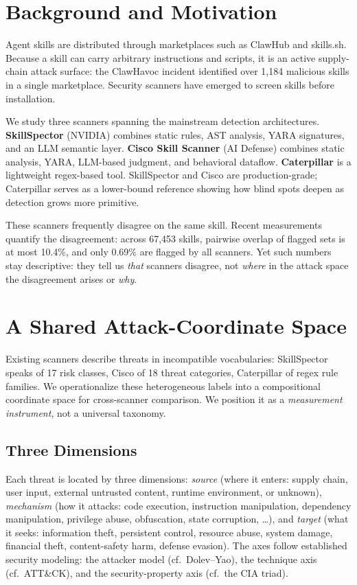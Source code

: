 \documentclass[sigconf,nonacm]{acmart}
\begin{document}
\section{Background and Motivation}
\label{sec:background}

Agent skills are distributed through marketplaces such as ClawHub and skills.sh. Because a skill can carry arbitrary instructions and scripts, it is an active supply-chain attack surface: the ClawHavoc incident identified over 1{,}184 malicious skills in a single marketplace. Security scanners have emerged to screen skills before installation.

We study three scanners spanning the mainstream detection architectures. \textbf{SkillSpector} (NVIDIA) combines static rules, AST analysis, YARA signatures, and an LLM semantic layer. \textbf{Cisco Skill Scanner} (AI Defense) combines static analysis, YARA, LLM-based judgment, and behavioral dataflow. \textbf{Caterpillar} is a lightweight regex-based tool. SkillSpector and Cisco are production-grade; Caterpillar serves as a lower-bound reference showing how blind spots deepen as detection grows more primitive.

These scanners frequently disagree on the same skill. Recent measurements quantify the disagreement: across 67{,}453 skills, pairwise overlap of flagged sets is at most 10.4\%, and only 0.69\% are flagged by all scanners. Yet such numbers stay descriptive: they tell us \emph{that} scanners disagree, not \emph{where} in the attack space the disagreement arises or \emph{why}.

\section{A Shared Attack-Coordinate Space}
\label{sec:measure}

Existing scanners describe threats in incompatible vocabularies: SkillSpector speaks of 17 risk classes, Cisco of 18 threat categories, Caterpillar of regex rule families. We operationalize these heterogeneous labels into a compositional coordinate space for cross-scanner comparison. We position it as a \emph{measurement instrument}, not a universal taxonomy.

\subsection{Three Dimensions}
Each threat is located by three dimensions: \emph{source} (where it enters: supply chain, user input, external untrusted content, runtime environment, or unknown), \emph{mechanism} (how it attacks: code execution, instruction manipulation, dependency manipulation, privilege abuse, obfuscation, state corruption, \ldots), and \emph{target} (what it seeks: information theft, persistent control, resource abuse, system damage, financial theft, content-safety harm, defense evasion). The axes follow established security modeling: the attacker model (cf.\ Dolev--Yao), the technique axis (cf.\ ATT\&CK), and the security-property axis (cf.\ the CIA triad).
\end{document}
